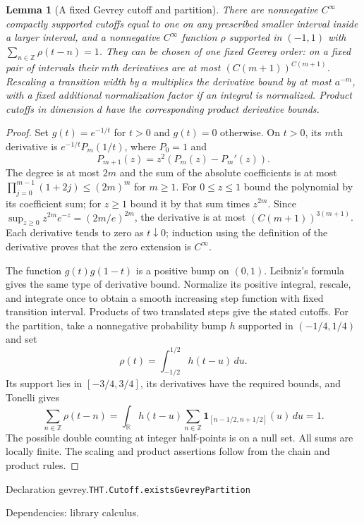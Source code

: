 \documentclass[11pt]{article}
\newtheorem{lemma}[theorem]{Lemma}
\theoremstyle{definition}
\newcommand{\R}{\mathbb R}
\newcommand{\Z}{\mathbb Z}
\newcommand{\one}{\mathbf 1}
\numberwithin{equation}{section}
\newcommand{\bp}[3]{\par\smallskip\begingroup\footnotesize
\noindent\hypertarget{bp:#1}{\textsf{Declaration #1.}}\quad\nolinkurl{#2}\par
\noindent\textsf{Dependencies:} #3.\par\endgroup\smallskip}
\begin{document}
\begin{lemma}[A fixed Gevrey cutoff and partition]\label{lem:gevrey}
There are nonnegative $C^\infty$ compactly supported cutoffs equal to one on any prescribed smaller interval inside a larger interval, and a nonnegative $C^\infty$ function $\rho$ supported in $(-1,1)$ with $\sum_{n\in\Z}\rho(t-n)=1$. They can be chosen of one fixed Gevrey order: on a fixed pair of intervals their $m$th derivatives are at most $(C(m+1))^{C(m+1)}$. Rescaling a transition width by $a$ multiplies the derivative bound by at most $a^{-m}$, with a fixed additional normalization factor if an integral is normalized. Product cutoffs in dimension $d$ have the corresponding product derivative bounds.
\end{lemma}
\begin{proof}
Set $g(t)=e^{-1/t}$ for $t>0$ and $g(t)=0$ otherwise. On $t>0$, its $m$th derivative is $e^{-1/t}P_m(1/t)$, where $P_0=1$ and
\[
 P_{m+1}(z)=z^2(P_m(z)-P_m'(z)).
\]
The degree is at most $2m$ and the sum of the absolute coefficients is at most $\prod_{j=0}^{m-1}(1+2j)\le(2m)^m$ for $m\ge1$. For $0\le z\le1$ bound the polynomial by its coefficient sum; for $z\ge1$ bound it by that sum times $z^{2m}$. Since $\sup_{z\ge0}z^{2m}e^{-z}=(2m/e)^{2m}$, the derivative is at most $(C(m+1))^{3(m+1)}$. Each derivative tends to zero as $t\downarrow0$; induction using the definition of the derivative proves that the zero extension is $C^\infty$.

The function $g(t)g(1-t)$ is a positive bump on $(0,1)$. Leibniz's formula gives the same type of derivative bound. Normalize its positive integral, rescale, and integrate once to obtain a smooth increasing step function with fixed transition interval. Products of two translated steps give the stated cutoffs. For the partition, take a nonnegative probability bump $h$ supported in $(-1/4,1/4)$ and set
\[
 \rho(t)=\int_{-1/2}^{1/2}h(t-u)\,du.
\]
Its support lies in $[-3/4,3/4]$, its derivatives have the required bounds, and Tonelli gives
\[
 \sum_{n\in\Z}\rho(t-n)
 =\int_{\R}h(t-u)\sum_{n\in\Z}\one_{[n-1/2,n+1/2]}(u)\,du=1.
\]
The possible double counting at integer half-points is on a null set. All sums are locally finite. The scaling and product assertions follow from the chain and product rules.
\end{proof}
\bp{gevrey}{THT.Cutoff.existsGevreyPartition}{library calculus}
\end{document}

